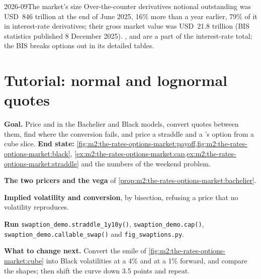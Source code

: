 \begin{dated}{2026-09}{The market's size}\label{dat:m2:the-rates-options-market:size}
Over-the-counter derivatives notional outstanding was USD~846 trillion at the
end of June 2025, 16\% more than a year earlier, 79\% of it in interest-rate
derivatives; their gross market value was USD~21.8 trillion (BIS statistics
published 8 December 2025). ,  and  are a part of the
interest-rate total; the BIS breaks options out in its detailed tables.
\end{dated}

\section{Tutorial: normal and lognormal quotes}\label{tut:m2:the-rates-options-market:quotes}

\begin{tutorial}
\textbf{Goal.} Price  and  in the Bachelier and Black models,
convert quotes between them, find where the conversion fails, and price a
straddle and a 's option from a cube slice. \textbf{End state:}
\cref{fig:m2:the-rates-options-market:payoff,fig:m2:the-rates-options-market:black},
\cref{ex:m2:the-rates-options-market:cap,ex:m2:the-rates-options-market:straddle}
and the numbers of the weekend problem.
\begin{tutsteps}
\item \textbf{The two pricers and the vega} of
\cref{prop:m2:the-rates-options-market:bachelier}.
\label{lst:m2:the-rates-options-market:pricers}
\item \textbf{Implied volatility and conversion}, by bisection, refusing a
price that no volatility reproduces.
\label{lst:m2:the-rates-options-market:implied}
\item \textbf{Run} \texttt{swaption\_demo.straddle\_1y10y()},
\texttt{swaption\_demo.cap()}, \texttt{swaption\_demo.callable\_swap()} and
\texttt{fig\_swaptions.py}.
\end{tutsteps}
\textbf{What to change next.} Convert the smile of
\cref{fig:m2:the-rates-options-market:cube} into Black volatilities at a 4\%
and at a 1\% forward, and compare the shapes; then shift the curve down 3.5
points and repeat.
\end{tutorial}

